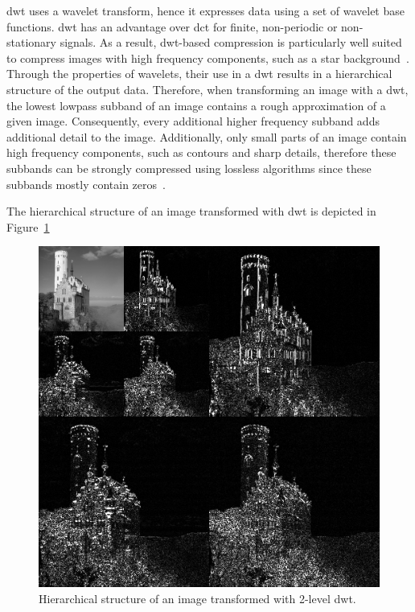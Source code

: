 \Gls{dwt} uses a wavelet transform, hence it expresses data using a set of wavelet base functions. \gls{dwt} has an advantage over \gls{dct} for finite, non-periodic or non-stationary signals. As a result, \gls{dwt}-based compression is particularly well suited to compress images with high frequency components, such as a star background~\cite{Bocharova2009CompressionMultimedia}. Through the properties of wavelets, their use in a \gls{dwt} results in a hierarchical structure of the output data. Therefore, when transforming an image with a \gls{dwt}, the lowest lowpass subband of an image contains a rough approximation of a given image. Consequently, every additional higher frequency subband adds additional detail to the image. Additionally, only small parts of an image contain high frequency components, such as contours and sharp details, therefore these subbands can be strongly compressed using lossless algorithms since these subbands mostly contain zeros~\cite{Bocharova2009CompressionMultimedia}.

The hierarchical structure of an image transformed with \gls{dwt} is depicted in Figure~\ref{fig:jp2_hierarchy}
\begin{figure}[htb]
    \centering
        \includegraphics[width=.7\textwidth]{doc/thesis/0_figures/jp2_jpeg/Jpeg2000_2-level_wavelet_transform-lichtenstein.png}
        \caption{Hierarchical structure of an image transformed with 2-level \gls{dwt}.}
        \label{fig:jp2_hierarchy}
\end{figure}

